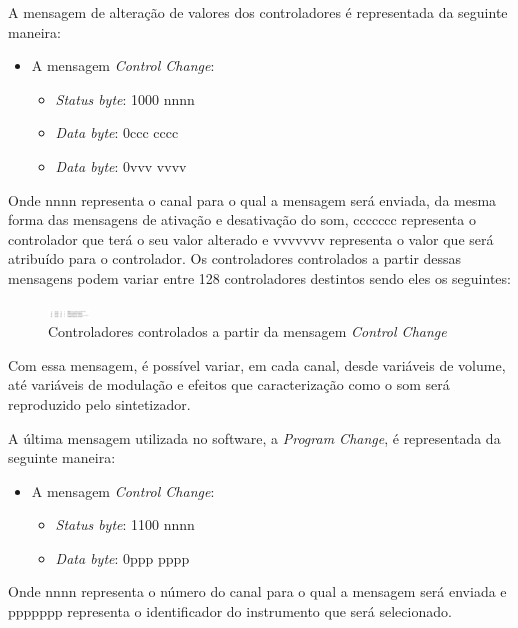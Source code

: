 \documentclass[12pt]{report}
\begin{document}
A mensagem de alteração de valores dos controladores é representada da seguinte maneira:
\begin{itemize}
  \item A mensagem {\it Control Change}:
  \begin{itemize}
    \item {\it Status byte}: 1000 nnnn
    \item {\it Data byte}: 0ccc cccc
    \item {\it Data byte}: 0vvv vvvv
  \end{itemize}
\end{itemize}

Onde nnnn representa o canal para o qual a mensagem será enviada, da mesma forma das mensagens de ativação e desativação do som, ccccccc representa o controlador que terá o seu valor alterado e vvvvvvv representa o valor que será atribuído para o controlador. Os controladores controlados a partir dessas mensagens podem variar entre 128 controladores destintos sendo eles os seguintes:

\begin{figure}[H]
  \centering
    \includegraphics[width=0.1\textwidth]{imagens/controladores.png}
    \caption{Controladores controlados a partir da mensagem {\it Control Change}}
  \label{fig:controladores}
\end{figure}

Com essa mensagem, é possível variar, em cada canal, desde variáveis de volume, até variáveis de modulação e efeitos que caracterização como o som será reproduzido pelo sintetizador.

A última mensagem utilizada no software, a {\it Program Change}, é representada da seguinte maneira:
\begin{itemize}
  \item A mensagem {\it Control Change}:
  \begin{itemize}
    \item {\it Status byte}: 1100 nnnn
    \item {\it Data byte}: 0ppp pppp
  \end{itemize}
\end{itemize}

Onde nnnn representa o número do canal para o qual a mensagem será enviada e ppppppp representa o identificador do instrumento que será selecionado.
\end{document}
